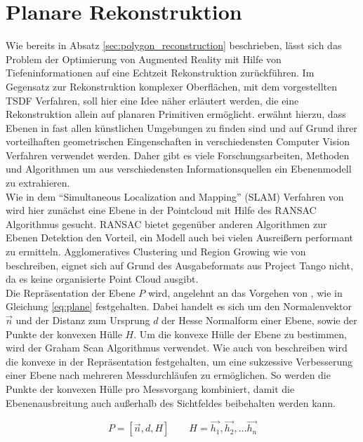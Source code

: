 \section{Planare Rekonstruktion}

Wie bereits in Absatz \ref{sec:polygon_reconstruction} beschrieben, lässt sich das Problem der Optimierung von Augmented Reality mit Hilfe von Tiefeninformationen auf eine Echtzeit Rekonstruktion zurückführen. Im Gegensatz zur Rekonstruktion komplexer Oberflächen, mit dem vorgestellten TSDF Verfahren, soll hier eine Idee näher erläutert werden, die eine Rekonstruktion allein auf planaren Primitiven ermöglicht. \citet{yang2010plane} erwähnt hierzu, dass Ebenen in fast allen künstlichen Umgebungen zu finden sind und auf Grund ihrer vorteilhaften geometrischen Eingenschaften in verschiedensten Computer Vision Verfahren verwendet werden. Daher gibt es viele Forschungsarbeiten, Methoden und Algorithmen um aus verschiedensten Informationsquellen ein Ebenenmodell zu extrahieren.\\

Wie in dem \enquote{Simultaneous Localization and Mapping} (SLAM) Verfahren von \citet{trevor2012planar} wird hier zunächst eine Ebene in der Pointcloud mit Hilfe des RANSAC Algorithmus gesucht. RANSAC bietet gegenüber anderen Algorithmen zur Ebenen Detektion den Vorteil, ein Modell auch bei vielen Ausreißern performant zu ermitteln. Agglomeratives Clustering und Region Growing wie von \citet{feng2014fast} beschreiben, eignet sich auf Grund des Ausgabeformats aus Project Tango nicht, da es keine organisierte Point Cloud ausgibt. \\

Die Repräsentation der Ebene \(P\) wird, angelehnt an das Vorgehen von \citet{trevor2012planar}, wie in Gleichung \ref{eq:plane} festgehalten. Dabei handelt es sich um den Normalenvektor \(\vec{n}\) und der Distanz zum Ursprung \(d\) der Hesse Normalform einer Ebene, sowie der Punkte der konvexen Hülle \(H\). Um die konvexe Hülle der Ebene zu bestimmen, wird der Graham Scan Algorithmus verwendet. Wie auch von \citet{trevor2012planar} beschreiben wird die konvexe in der Repräsentation festgehalten, um eine sukzessive Verbesserung einer Ebene nach mehreren Messdurchläufen zu ermöglichen. So werden die Punkte der konvexen Hülle pro Messvorgang kombiniert, damit die Ebenenausbreitung auch außerhalb des Sichtfeldes beibehalten werden kann.

\begin{equation} \label{eq:plane}
P=\left[\vec{n}, d, H\right] \qquad H=\vec{h_1}, \vec{h_2}, \ldots  \vec{h_n}
\end{equation}

